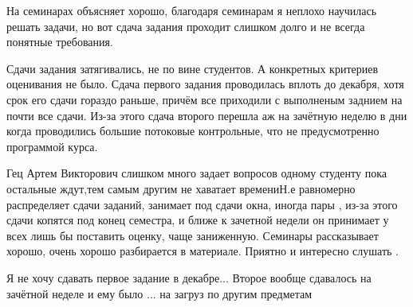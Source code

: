             \begin{commentbox} 
                На семинарах объясняет хорошо, благодаря семинарам я неплохо научилась решать задачи, но вот сдача задания проходит слишком долго и не всегда понятные требования. 
            \end{commentbox} 
        
            \begin{commentbox} 
                Сдачи задания затягивались, не по вине студентов. А конкретных критериев оценивания не было. Сдача первого задания проводилась вплоть до декабря, хотя срок его сдачи гораздо раньше, причём все приходили с выполненым заднием на почти все сдачи. Из-за этого сдача второго перешла аж на зачётную неделю в дни когда проводились большие потоковые контрольные, что не предусмотренно программой курса. 
            \end{commentbox} 
        
            \begin{commentbox} 
                Гец Артем Викторович слишком много задает вопросов одному студенту пока остальные ждут,тем самым другим не хаватает времениН.е равномерно распределяет сдачи заданий, занимает под сдачи окна, иногда пары , из-за этого сдачи копятся под конец семестра, и ближе к зачетной недели он принимает у всех лишь бы поставить оценку, чаще заниженную. Семинары рассказывает хорошо, очень хорошо разбирается в материале. Приятно и интересно слушать . 
            \end{commentbox} 
        
            \begin{commentbox} 
                Я не хочу сдавать первое задание в декабре...
                Второе вообще сдавалось на зачётной неделе и ему было ... на загруз по другим предметам 
            \end{commentbox}


